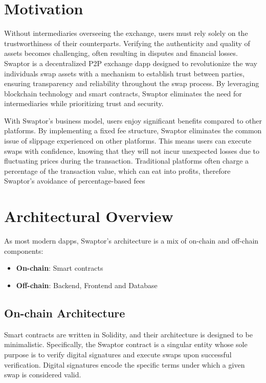 \documentclass[12pt]{article}
\begin{document}
\section{Motivation}

Without intermediaries overseeing the exchange, users must rely solely on the trustworthiness of their
counterparts. Verifying the authenticity and quality of assets becomes challenging, often resulting
in disputes and financial losses. Swaptor is a decentralized P2P exchange dapp designed to revolutionize
the way individuals swap assets with a mechanism to establish trust between parties, ensuring transparency
and reliability throughout the swap process. By leveraging blockchain technology and smart contracts,
Swaptor eliminates the need for intermediaries while prioritizing trust and security.

With Swaptor's business model, users enjoy significant benefits compared to other platforms. By implementing
a fixed fee structure, Swaptor eliminates the common issue of slippage experienced on other platforms.
This means users can execute swaps with confidence, knowing that they will not incur unexpected losses due
to fluctuating prices during the transaction. Traditional platforms often charge a percentage of the transaction value,
which can eat into profits, therefore Swaptor's avoidance of percentage-based fees

\newpage

\section{Architectural Overview} \label{form}
\indent As most modern dapps, Swaptor's architecture is a mix of on-chain and off-chain components:
\begin{itemize}
  \item \textbf{On-chain}: Smart contracts
  \item \textbf{Off-chain}: Backend, Frontend and Database
\end{itemize}

\subsection{On-chain Architecture}

\indent Smart contracts are written in Solidity, and their architecture is designed to be minimalistic.
Specifically, the Swaptor contract is a singular entity whose sole purpose is to verify digital signatures
and execute swaps upon successful verification. Digital signatures encode the specific terms under which a given swap is considered valid.
\end{document}
